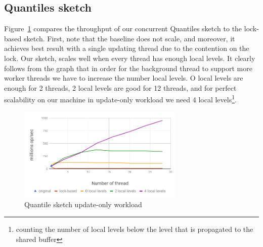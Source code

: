 


\subsection{Quantiles sketch}
\label{sub:quantilesExp}

Figure~\ref{fig:ConccurentQuantilesUpdate}  compares the
throughput of our concurrent Quantiles sketch to the lock-based sketch.
First, note that the baseline does not scale, and moreover, it
achieves best result with a single updating thread due to the contention on the lock.
Our sketch, scales well when every thread
has enough local levels.
It clearly follows from the graph that in order for the
background thread to support more worker threads we have to
increase the number local levels.
O local levels are enough for 2 threads, 2 local levels are good
for 12 threads, and for perfect scalability on our machine in
update-only workload we need 4 local levels\footnote{counting the number of local levels below the level that is propagated to the shared buffer}.

\begin{figure}[h]
  \centering
  \includegraphics*[width=3.1in]{images/QuantilesUpdate}
  \caption{Quantile sketch update-only workload}
   \label{fig:ConccurentQuantilesUpdate}
\end{figure}

